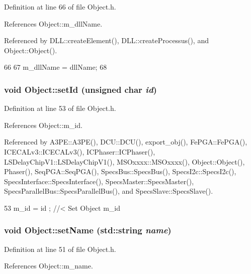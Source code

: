 Definition at line 66 of file Object.h.

References Object::m\_\-dllName.

Referenced by DLL::createElement(), DLL::createProcessus(), and Object::Object().


\begin{DoxyCode}
66                                       {
67     m_dllName = dllName;
68   }
\end{DoxyCode}
\hypertarget{classObject_a398fe08cba594a0ce6891d59fe4f159f}{
\subsubsection[{setId}]{\setlength{\rightskip}{0pt plus 5cm}void Object::setId (unsigned char {\em id})}}
\label{classObject_a398fe08cba594a0ce6891d59fe4f159f}


Definition at line 53 of file Object.h.

References Object::m\_\-id.

Referenced by A3PE::A3PE(), DCU::DCU(), export\_\-obj(), FePGA::FePGA(), ICECALv3::ICECALv3(), ICPhaser::ICPhaser(), LSDelayChipV1::LSDelayChipV1(), MSOxxxx::MSOxxxx(), Object::Object(), Phaser(), SeqPGA::SeqPGA(), SpecsBus::SpecsBus(), SpecsI2c::SpecsI2c(), SpecsInterface::SpecsInterface(), SpecsMaster::SpecsMaster(), SpecsParallelBus::SpecsParallelBus(), and SpecsSlave::SpecsSlave().


\begin{DoxyCode}
53 { m_id    = id    ; } //< Set Object m_id
\end{DoxyCode}
\hypertarget{classObject_ae30fea75683c2d149b6b6d17c09ecd0c}{
\subsubsection[{setName}]{\setlength{\rightskip}{0pt plus 5cm}void Object::setName (std::string {\em name})}}
\label{classObject_ae30fea75683c2d149b6b6d17c09ecd0c}


Definition at line 51 of file Object.h.

References Object::m\_\-name.

